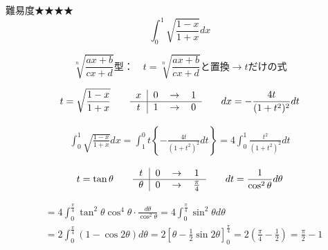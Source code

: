 \documentclass[main]{subfiles}
\begin{document}

\begin{mondai}{難易度★★★★}{}
    $$\int ^1_0 \sqrt{\frac{1-x}{1+x}} dx$$
    
    \tcblower
    
    \begin{pointbox}
        \begin{center}
        $$\sqrt[n]{\frac{ax+b}{cx+d}}\text{型：}\quad t=\sqrt[n]{\frac{ax+b}{cx+d}}\text{と置換}\rightarrow  t\text{だけの式}$$
        \end{center}
    \end{pointbox}

    \begin{tcolorbox}
        \begin{align*}
            t=\sqrt{\frac{1-x}{1+x}} \qquad 
            \begin{tabular}{c|ccc}
                $x$ & $0$ & $\rightarrow$ & $1$ \\ \hline
                $t$ & $1$ & $\rightarrow$ & $0$ \\
            \end{tabular} \qquad
            dx=-\frac{4t}{(1+t^2)^2}dt
        \end{align*}
    \end{tcolorbox}
    \begin{align*}
        \int ^1_0 \sqrt{\frac{1-x}{1+x}} dx
            = \int ^0_1 t \left\{ -\frac{4t}{(1+t^2)^2}dt \right\}
            = 4 \int ^1_0 \frac{t^2}{(1+t^2)^2}dt
    \end{align*}
    \begin{tcolorbox}
        \begin{align*}
            t=\tan\theta \qquad 
            \begin{tabular}{c|ccc}
                $t$ & $0$ & $\rightarrow$ & $1$ \\ \hline
                $\theta$ & $0$ & $\rightarrow$ & $\frac{\pi}{4}$ \\
            \end{tabular} \qquad
            dt=\frac{1}{\cos^2\theta}d\theta
        \end{align*}
    \end{tcolorbox}
    \begin{align*}
            &= 4\int^{\frac{\pi}{4}}_0 \tan^2\theta\cos^4\theta\cdot\frac{d\theta}{\cos^2\theta}
            = 4\int^{\frac{\pi}{4}}_0 \sin^2\theta d\theta \\
            &= 2\int^{\frac{\pi}{4}}_0 \left(1-\cos 2\theta\right) d\theta
            = 2\left[ \theta-\frac{1}{2}\sin 2\theta \right]_0^{\frac{\pi}{4}}
            = 2\left( \frac{\pi}{4}-\frac{1}{2} \right)
            = \frac{\pi}{2}-1 \tag{答}
    \end{align*}


\end{mondai}
\end{document}
